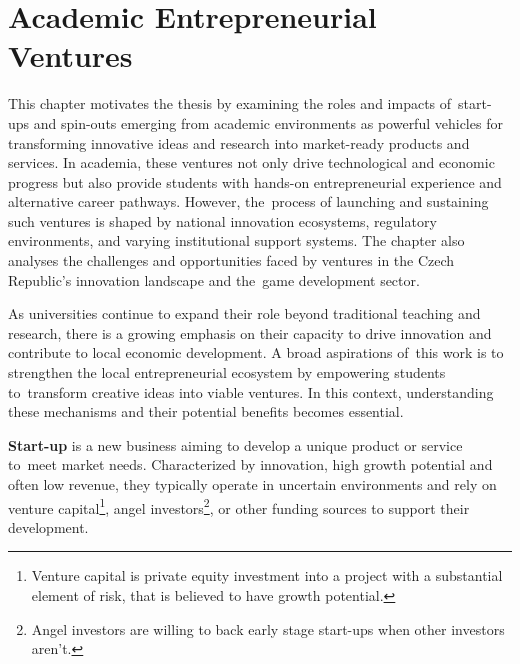 \chapter{Academic Entrepreneurial Ventures}

\begin{chapterabstract}
	This chapter motivates the thesis by examining the roles and impacts of~start-ups and spin-outs emerging from academic environments as powerful vehicles for transforming innovative ideas and research into market-ready products and services. In academia, these ventures not only drive technological and economic progress but also provide students with hands-on entrepreneurial experience and alternative career pathways. However, the~process of launching and sustaining such ventures is shaped by national innovation ecosystems, regulatory environments, and varying institutional support systems. The chapter also analyses the challenges and opportunities faced by ventures in the Czech Republic’s innovation landscape and the~game development sector.
\end{chapterabstract}

As universities continue to expand their role beyond traditional teaching and research, there is a growing emphasis on their capacity to drive innovation and contribute to local economic development. A broad aspirations of~this work is to strengthen the local entrepreneurial ecosystem by empowering students to~transform creative ideas into viable ventures. In this context, understanding these mechanisms and their potential benefits becomes essential.

\textbf{Start-up} is a new business aiming to develop a unique product or service to~meet market needs. Characterized by innovation, high growth potential and often low revenue, they typically operate in uncertain environments and rely on venture capital\footnote{Venture capital is private equity investment into a project with a substantial element of risk, that is believed to have growth potential.}, angel investors\footnote{Angel investors are willing to back early stage start-ups when other investors aren't.}, or other funding sources to support their development.\cite{investopedia_start-ups}

